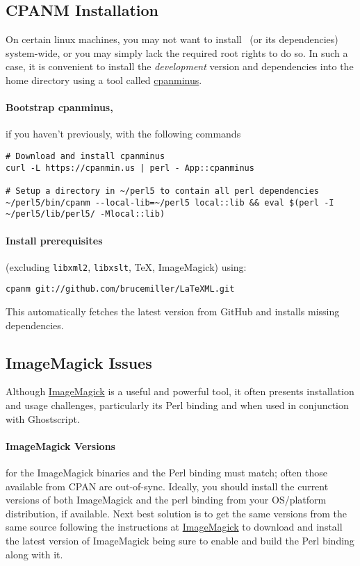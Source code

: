 \documentclass{article}
\begin{document}
\subsection{CPANM Installation}\label{get.cpanm}
On certain linux machines, you may not want to install \LaTeXML\ (or its dependencies)
system-wide, or you may simply lack the required root rights to do so. 
In such a case, it is convenient to install the \emph{development} version and 
dependencies into the home directory using a tool called 
\href{ https://github.com/miyagawa/cpanminus}{cpanminus}.

\paragraph*{Bootstrap cpanminus,} if you haven't previously,
with the following commands
\begin{lstlisting}[style=shell]
# Download and install cpanminus
curl -L https://cpanmin.us | perl - App::cpanminus

# Setup a directory in ~/perl5 to contain all perl dependencies
~/perl5/bin/cpanm --local-lib=~/perl5 local::lib && eval $(perl -I ~/perl5/lib/perl5/ -Mlocal::lib)
\end{lstlisting}

\paragraph*{Install prerequisites}
(excluding  \texttt{libxml2},  \texttt{libxslt}, \TeX, ImageMagick)
using:
\begin{lstlisting}[style=shell]
cpanm git://github.com/brucemiller/LaTeXML.git
\end{lstlisting}
This automatically fetches the latest version from GitHub and installs 
missing dependencies. 

\subsection{ImageMagick Issues}\label{get.imagemagick}
Although \href{https://imagemagick.com/}{ImageMagick} is a useful and powerful tool,
it often presents installation and usage challenges, particularly its Perl binding
and when used in conjunction with Ghostscript.

\paragraph*{ImageMagick Versions} for the ImageMagick binaries and the Perl binding must match;
often those available from CPAN are out-of-sync.
Ideally, you should install the current versions of both ImageMagick and the perl binding
from your OS/platform distribution, if available.
Next best solution is to get the same versions from the same source
following the instructions at \href{https://www.imagemagick.org/}{ImageMagick}
to download and install the latest version of ImageMagick being sure to enable
and build the Perl binding along with it.
\end{document}
